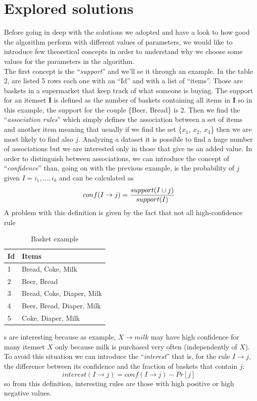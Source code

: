 \documentclass{acm_proc_article-sp-sigmod09}
\begin{document}
	\section{Explored solutions}
	Before going in deep with the solutions we adopted and have a look to how good the algorithm perform with different values of parameters, we would like to introduce few theoretical concepts in order to understand why we choose some values for the parameters in the algorithm.\\
	The first concept is the ``\textit{support}'' and we'll se it through an example. In the table 2, are listed 5 rows each one with an ``Id'' and with a list of ``items''. Those are baskets in a supermarket that keep track of what someone is buying. The support for an itemset \textbf{I} is defined as the number of baskets	containing all items in \textbf{I} so in this example, the support for the couple \{Beer, Bread\} is 2.
	Then we find the ``\textit{association rules}'' which simply defines the association between a set of items and another item meaning that usually if we find the set \{$x_1$, $x_2$, $x_3$\} then we are most likely to find also $j$.
	Analyzing a dataset it is possible to find a huge number of associations but we are interested only in those that give us an added value. In order to distinguish between associations, we can introduce the concept of ``\textit{confidence}'' than, going on with the previous example, is the probability of $j$ given $I = {i_1,...,i_k}$ and can be calculated as $$conf(I \rightarrow j) = {support(I \cup j) \over support(I)}$$ 
	A problem with this definition is given by the fact that not all high-confidence rule\begin{table}
		\centering
		\caption{Basket example}
		\begin{tabular}{|l|l|}              \hline
			\textbf{Id}&\textbf{Items}   \\ \hline
			1&{Bread, Coke, Milk}        \\ \hline
			2&{Beer, Bread}              \\ \hline
			3&{Bread, Coke, Diaper, Milk}\\ \hline
			4&{Beer, Bread, Diaper, Milk}\\ \hline
			5&{Coke, Diaper, Milk}       \\ \hline
		\end{tabular}
	\end{table}s are interesting because as example, $X \rightarrow \textit{milk}$ may have high confidence for many itemset $X$ only because milk is purchased very often (independently of $X$). To avoid this situation we can introduce the ``\textit{interest}'' that is, for the rule $I \rightarrow j$, the difference between its confidence and the fraction of baskets that contain $j$: $$interest(I \rightarrow j) = conf(I \rightarrow j) - Pr[j]$$ so from this definition, interesting rules are those with high positive or high negative values.
\end{document}
